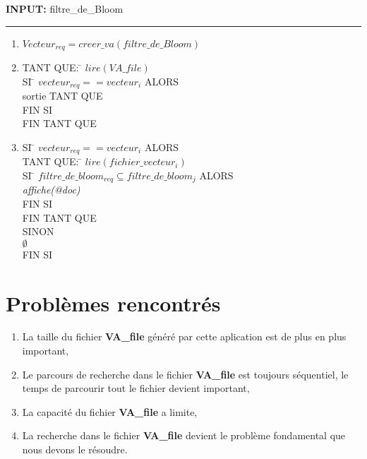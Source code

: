 \documentclass[a4paper,12pt]{report}
\begin{document}
\begin{flushleft}
	\begin{framed}
		\textbf{INPUT:} filtre\_de\_Bloom
		\noindent\rule{\linewidth}{0.5pt}
		\begin{enumerate}
			\item $ Vecteur_{req} = creer\_va(filtre\_de\_Bloom) $
			\item
				\begin{tabbing}
					TANT QUE: \= $lire(VA\_file)$\\
						\> SI \= $vecteur_{req} == vecteur_i$ ALORS\\
						\> \> sortie TANT QUE\\
						\> FIN SI\\
					FIN TANT QUE
				\end{tabbing}
			\item 
				\begin{tabbing}
					SI \= $vecteur_{req} == vecteur_i$ ALORS\\
					\> TANT QUE: \= $lire(fichier\_vecteur_{i})$\\
					\> \> SI \= $filtre\_de\_bloom_{req} \subseteq filtre\_de\_bloom_j$ ALORS\\
					\> \> \> \textit{affiche(@doc)} \\
					\> \> FIN SI\\
					\> FIN TANT QUE\\
					SINON\\
					\> $\emptyset$\\
					FIN SI
				\end{tabbing}
		\end{enumerate}	
	\end{framed}
\end{flushleft}

\section{Problèmes rencontrés}
\begin{enumerate}
	\item La taille du fichier \textbf{VA\_file} généré par cette aplication est de plus en plus important,
	\item Le parcours de recherche dans le fichier \textbf{VA\_file} est toujours séquentiel, le temps de parcourir tout le fichier devient important,
	\item La capacité du fichier \textbf{VA\_file} a limite,
	\item La recherche dans le fichier \textbf{VA\_file} devient le problème fondamental que nous devons le résoudre.
\end{enumerate}
\end{document}
